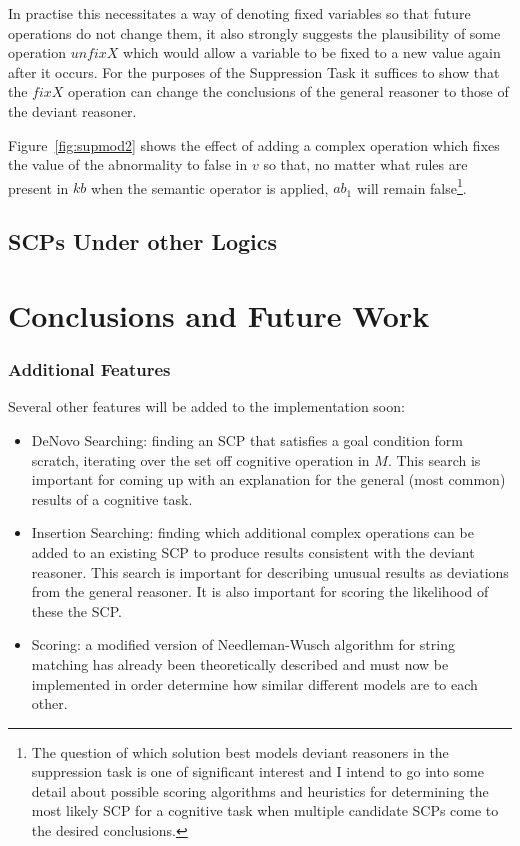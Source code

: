 \documentclass{article}
\begin{document}
In practise this necessitates a way of denoting fixed variables so that future operations do not change them, it also strongly suggests the plausibility of some operation $unfixX$ which would allow a variable to be fixed to a new value again after it occurs. For the purposes of the Suppression Task it suffices to show that the $fixX$ operation can change the conclusions of the general reasoner to those of the deviant reasoner.

Figure~\ref{fig:supmod2} shows the effect of adding a complex operation which fixes the value of the abnormality to false in $v$ so that, no matter what rules are present in $kb$ when the semantic operator is applied, $ab_1$ will remain false\footnote{The question of which solution best models deviant reasoners in the suppression task is one of significant interest and I intend to go into some detail about possible scoring algorithms and heuristics for determining the most likely SCP for a cognitive task when multiple candidate SCPs come to the desired conclusions.}.
\subsection{SCPs Under other Logics}
\section{Conclusions and Future Work}

\subsubsection{Additional Features}
Several other features will be added to the implementation soon:
\begin{itemize}
\item DeNovo Searching: finding an SCP that satisfies a goal condition form scratch, iterating over the set off cognitive operation in $M$. This search is important for coming up with an explanation for the general (most common) results of a cognitive task.
\item Insertion Searching: finding which additional complex operations can be added to an existing SCP to produce results consistent with the deviant reasoner. This search is important for describing unusual results as deviations from the general reasoner. It is also important for scoring the likelihood of these the SCP.
\item Scoring: a modified version of Needleman-Wusch algorithm for string matching has already been theoretically described and must now be implemented in order determine how similar different models are to each other.
\end{itemize}
\newpage
	
\end{document}
